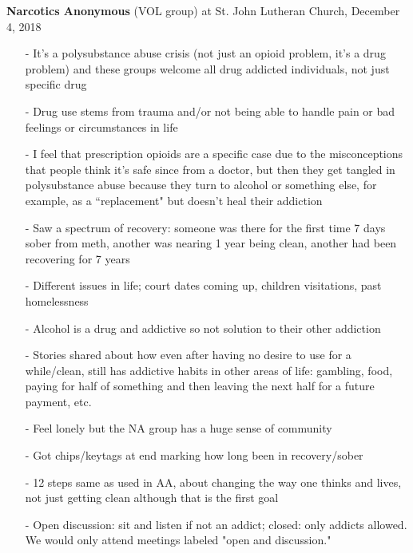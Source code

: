 \documentclass[12pt]{article}
\begin{document}
\textbf{Narcotics Anonymous} (VOL group) at St. John Lutheran Church, December 4, 2018 \\

\begin{itemize}
\item[-] It's a polysubstance abuse crisis (not just an opioid problem, it's a drug problem) and these groups welcome all drug addicted individuals, not just specific drug 
\item[-] Drug use stems from trauma and/or not being able to handle pain or bad feelings or circumstances in life
\item[-] I feel that prescription opioids are a specific case due to the misconceptions that people think it's safe since from a doctor, but then they get tangled in polysubstance abuse because they turn to alcohol or something else, for example, as a ``replacement" but doesn't heal their addiction 
\item[-] Saw a spectrum of recovery: someone was there for the first time 7 days sober from meth, another was nearing 1 year being clean, another had been recovering for 7 years
\item[-] Different issues in life; court dates coming up, children visitations, past homelessness
\item[-] Alcohol is a drug and addictive so not solution to their other addiction
\item[-] Stories shared about how even after having no desire to use for a while/clean, still has addictive habits in other areas of life: gambling, food, paying for half of something and then leaving the next half for a future payment, etc. 
\item[-] Feel lonely but the NA group has a huge sense of community
\item[-] Got chips/keytags at end marking how long been in recovery/sober 
\item[-]12 steps same as used in AA, about changing the way one thinks and lives, not just getting clean although that is the first goal 
\item[-] Open discussion: sit and listen if not an addict; closed: only addicts allowed. We would only attend meetings labeled "open and discussion." 


\end{itemize}
\end{document}
